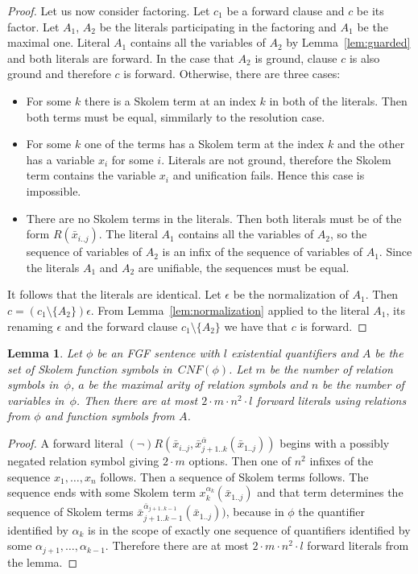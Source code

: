 \documentclass[english, shortabstract]{iithesis}
\theoremstyle{definition} \newtheorem{definition}{Definition}[chapter]
\theoremstyle{remark} \newtheorem{remark}[definition]{Observation}
\theoremstyle{plain} \newtheorem{theorem}[definition]{Theorem}
\theoremstyle{plain} \newtheorem{lemma}[definition]{Lemma}
\begin{document}
\begin{proof}
\par Let us now consider factoring. Let $c_1$ be a forward clause and $c$ be its factor.
Let $A_1$, $A_2$ be the literals participating in the factoring and $A_1$ be the maximal one.
Literal $A_1$ contains all the variables of $A_2$ by Lemma~\ref{lem:guarded} and both literals are forward. 
In the case that $A_2$ is ground, clause $c$ is also ground and therefore $c$ is forward. 
Otherwise, there are three cases:
\begin{itemize}
    \item For some $k$ there is a Skolem term at an index $k$ in both of the literals. Then both terms must be equal, simmilarly to the resolution case.
    \item For some $k$ one of the terms has a Skolem term at the index $k$ and the other has a variable $x_i$ for some $i$. Literals are not ground, therefore the Skolem term contains the variable $x_i$ and unification fails. Hence this case is impossible.
    \item There are no Skolem terms in the literals. Then both literals must be of the form $R(\bar{x}_{i..j})$. The literal $A_1$ contains all the variables of $A_2$, so the sequence of variables of $A_2$ is an infix of the sequence of variables of $A_1$. Since the literals $A_1$ and $A_2$ are unifiable, the sequences must be equal.
\end{itemize}
It follows that the literals are identical. 
Let $\epsilon$ be the normalization of $A_1$.
Then $c=(c_1\setminus\{A_2\})\epsilon$. From Lemma~\ref{lem:normalization} applied to the 
literal $A_1$, its renaming $\epsilon$ and the forward clause $c_1\setminus\{A_2\}$ we have that $c$ is forward.
\end{proof}

\begin{lemma}\label{lem:size}
Let $\phi$ be an FGF sentence with $l$ existential quantifiers and 
$A$ be the set of Skolem function symbols in~$\mathit{CNF}(\phi)$.
Let $m$ be the number of relation symbols in~$\phi$, $a$ be the maximal arity
of relation symbols and $n$ be the number of variables in~$\phi$. 
Then there are at most $2\cdot m \cdot n^2 \cdot l$ forward literals using relations from $\phi$ and function symbols from $A$.
\end{lemma}
\begin{proof}
A forward literal $(\lnot)R(\bar{x}_{i..j}, \bar{x}^{\bar{\alpha}}_{{j+1..k}}(\bar{x}_{1..j}))$
begins with a possibly negated relation symbol giving $2\cdot m$ options. 
Then one of $n^2$ infixes of the sequence $x_1, \dots, x_n$ follows.
Then a sequence of Skolem terms follows.
The sequence ends with some Skolem term $x^{\alpha_k}_k(\bar{x}_{1..j})$ and that term 
determines the sequence of Skolem terms $\bar{x}^{\bar{\alpha}_{j+1..k-1}}_{{j+1..k-1}}(\bar{x}_{1..j}))$,
because in $\phi$ the quantifier identified by $\alpha_k$ is in the scope of exactly one sequence of quantifiers identified by some $\alpha_{j+1},\dots, \alpha_{k-1}$.
Therefore there are at most $2\cdot m \cdot n^2 \cdot l$ forward literals from the lemma.
\end{proof}
\end{document}
